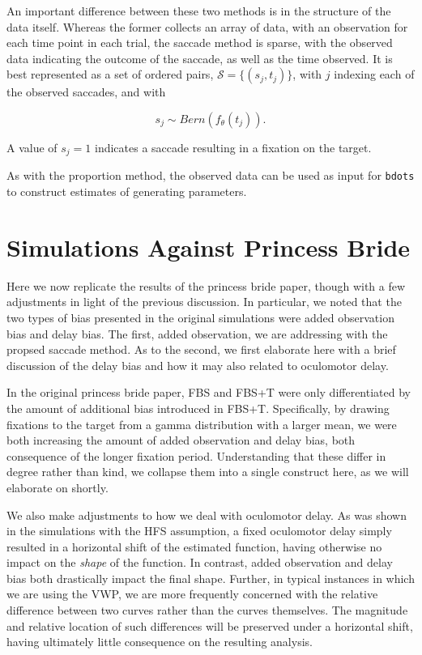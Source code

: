 \documentclass{article}
\newcommand{\xt}{\texttt}%
\begin{document}
An important difference between these two methods is in the structure of the data itself. Whereas the former collects an array of data, with an observation for each time point in each trial, the saccade method is sparse, with the observed data indicating the outcome of the saccade, as well as the time observed. It is best represented as a set of ordered pairs, $\mathcal{S} = \{(s_{j}, t_j)\}$, with $j$ indexing each of the observed saccades, and with

\begin{equation}
s_{j} \sim Bern(f_{\theta}(t_j)).
\end{equation}

A value of $s_j = 1$ indicates a saccade resulting in a fixation on the target. 


As with the proportion method, the observed data can be used as input for \xt{bdots} to construct estimates of generating parameters. 


\section{Simulations Against Princess Bride}

Here we now replicate the results of the princess bride paper, though with a few adjustments in light of the previous discussion. In particular, we noted that the two types of bias presented in the original simulations were added observation bias and delay bias. The first, added observation, we are addressing with the propsed saccade method. As to the second, we first elaborate here with a brief discussion of the delay bias and how it may also related to oculomotor delay.

In the original princess bride paper, FBS and FBS+T were only differentiated by the amount of additional bias introduced in FBS+T. Specifically, by drawing fixations to the target from a gamma distribution with a larger mean, we were both increasing the amount of added observation and delay bias, both consequence of the longer fixation period. Understanding that these differ in degree rather than kind, we collapse them into a single construct here, as we will elaborate on shortly.

We also make adjustments to how we deal with oculomotor delay. As was shown in the simulations with the HFS assumption, a fixed oculomotor delay simply resulted in a horizontal shift of the estimated function, having otherwise no impact on the \textit{shape} of the function. In contrast, added observation and delay bias both drastically impact the final shape. Further, in typical instances in which we are using the VWP, we are more frequently concerned with the relative difference between two curves rather than the curves themselves. The magnitude and relative location of such differences will be preserved under a horizontal shift, having ultimately little consequence on the resulting analysis. 
\end{document}
